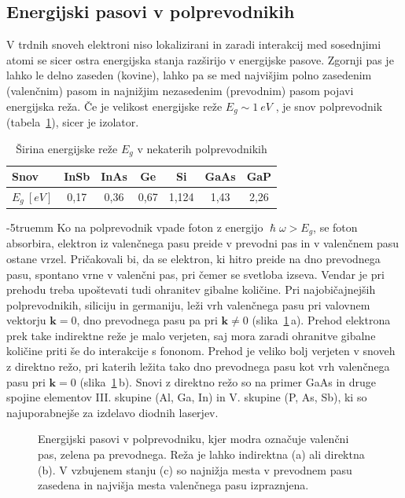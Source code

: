 \subsection*{Energijski pasovi v polprevodnikih}
V trdnih snoveh elektroni niso lokalizirani in zaradi interakcij med sosednjimi atomi
se sicer ostra energijska stanja razširijo v energijske pasove. Zgornji pas je lahko 
le delno zaseden (kovine), lahko pa se med najvišjim polno zasedenim 
(valenčnim) pasom in najnižjim nezasedenim (prevodnim) pasom pojavi energijska reža. 
Če je velikost energijske reže $E_g \sim 1~\si{eV}$ , je snov polprevodnik 
(tabela~\ref{table:gap}), sicer je izolator.
\begin{table}[ht]
 \centering
\begin{tabular}{|l|c|c|c|c|c|c|} \hline  
      Snov & InSb & InAs & Ge & Si & GaAs & GaP \\ \hline
      $E_g~[\si{eV}]$ & 0,17 & 0,36 & 0,67 & 1,124 & 1,43 & 2,26  \\ \hline  
\end{tabular}
  \caption{Širina energijske reže $E_g$ v nekaterih polprevodnikih}
\label{table:gap}
\end{table}
\vglue-5truemm
Ko na polprevodnik vpade foton z energijo $\hslash\omega > E_g$, se foton absorbira, elektron
iz valenčnega pasu preide v prevodni pas in v valenčnem pasu ostane vrzel. Pričakovali bi, 
da se elektron, ki hitro preide na dno prevodnega pasu, spontano vrne v valenčni 
pas, pri čemer se svetloba izseva. Vendar je pri 
prehodu treba upoštevati tudi ohranitev gibalne količine. Pri najobičajnejših polprevodnikih, 
siliciju in germaniju, leži vrh valenčnega pasu pri valovnem vektorju $\mathbf{k}=0$, 
dno prevodnega pasu pa pri $\mathbf{k} \neq 0$ (slika~\ref{fig:Ek}\,a).
Prehod elektrona prek take indirektne reže je malo verjeten, saj mora zaradi ohranitve 
gibalne količine priti še do interakcije s fononom. Prehod je veliko bolj verjeten v 
snoveh z direktno režo, pri katerih ležita tako dno prevodnega pasu kot vrh valenčnega pasu 
pri $\mathbf{k}=0$ (slika~\ref{fig:Ek}\,b). Snovi z direktno režo so na primer GaAs in 
druge spojine elementov III. skupine (Al, Ga, In) in V. skupine (P, As, Sb), ki so najuporabnejše 
za izdelavo diodnih laserjev.
\begin{figure}[ht]
\centering
\def\svgwidth{145truemm} 

\caption{Energijski pasovi v polprevodniku, kjer modra označuje valenčni pas, 
zelena pa prevodnega. Reža je lahko indirektna (a) ali direktna (b). V vzbujenem stanju (c) so 
najnižja mesta v prevodnem pasu zasedena in najvišja mesta valenčnega pasu
izpraznjena. 
}
\label{fig:Ek}
\end{figure}

